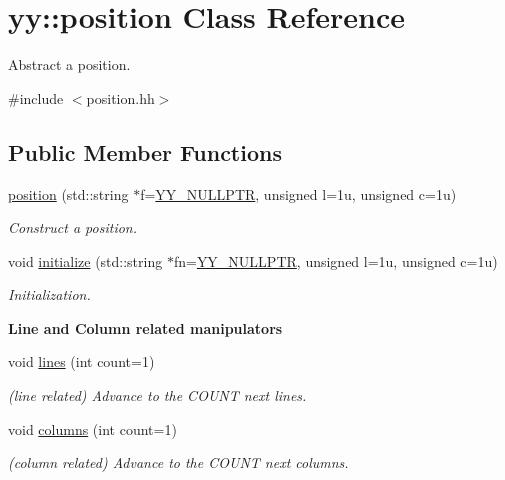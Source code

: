 \hypertarget{classyy_1_1position}{\section{yy\-:\-:position Class Reference}
\label{classyy_1_1position}
}


Abstract a position.  




{\ttfamily \#include $<$position.\-hh$>$}

\subsection*{Public Member Functions}
\begin{DoxyCompactItemize}
\item 
\hyperlink{classyy_1_1position_afd964bfe94552215bb8863fcfb9073c3}{position} (std\-::string $\ast$f=\hyperlink{position_8hh_a5a6c82f7ce4ad9cc8c6c08b7a2de5b84}{Y\-Y\-\_\-\-N\-U\-L\-L\-P\-T\-R}, unsigned l=1u, unsigned c=1u)
\begin{DoxyCompactList}\small\item\em Construct a position. \end{DoxyCompactList}\item 
void \hyperlink{classyy_1_1position_ab752c89b6fe9a3f5ca4d0d95e78f97dc}{initialize} (std\-::string $\ast$fn=\hyperlink{position_8hh_a5a6c82f7ce4ad9cc8c6c08b7a2de5b84}{Y\-Y\-\_\-\-N\-U\-L\-L\-P\-T\-R}, unsigned l=1u, unsigned c=1u)
\begin{DoxyCompactList}\small\item\em Initialization. \end{DoxyCompactList}\end{DoxyCompactItemize}
\begin{Indent}{\bf Line and Column related manipulators}\par
\begin{DoxyCompactItemize}
\item 
void \hyperlink{classyy_1_1position_a4fbdd03b4e09fa8755d79d3e675d6d3a}{lines} (int count=1)
\begin{DoxyCompactList}\small\item\em (line related) Advance to the C\-O\-U\-N\-T next lines. \end{DoxyCompactList}\item 
void \hyperlink{classyy_1_1position_ab15e0388c4fd433aa19c2435e49f72e9}{columns} (int count=1)
\begin{DoxyCompactList}\small\item\em (column related) Advance to the C\-O\-U\-N\-T next columns. \end{DoxyCompactList}\end{DoxyCompactItemize}
\end{Indent}
